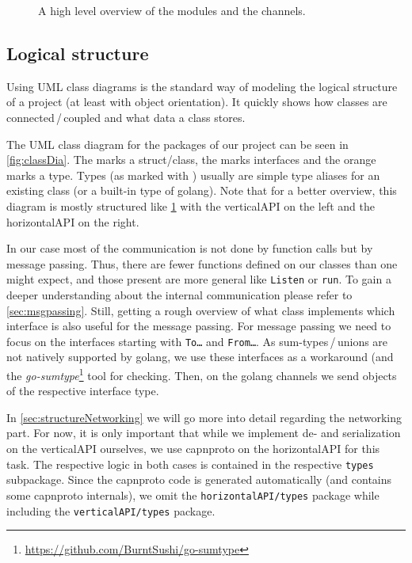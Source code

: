 \documentclass[a4paper,english,10pt,NET]{tumarticle}
\begin{document}
\begin{figure}
	\centering
	
	\caption{A high level overview of the modules and the channels.}
	\label{fig:overview}
\end{figure}

\subsection{Logical structure}
Using UML class diagrams is the standard way of modeling the logical structure of a project (at least with object orientation).
It quickly shows how classes are connected\,/\,coupled and what data a class stores.

The UML class diagram for the packages of our project can be seen in \cref{fig:classDia}.
The  marks a struct/class, the  marks interfaces and the orange  marks a type.
Types (as marked with ) usually are simple type aliases for an existing class (or a built-in type of golang).
Note that for a better overview, this diagram is mostly structured like \cref{fig:overview} with the verticalAPI on the left and the horizontalAPI on the right.

In our case most of the communication is not done by function calls but by message passing.
Thus, there are fewer functions defined on our classes than one might expect, and those present are more general like \texttt{Listen} or \texttt{run}.
To gain a deeper understanding about the internal communication please refer to \cref{sec:msgpassing}.
Still, getting a rough overview of what class implements which interface is also useful for the message passing.
For message passing we need to focus on the interfaces starting with \texttt{To\ldots} and \texttt{From\ldots}.
As sum-types\,/\,unions are not natively supported by golang, we use these interfaces as a workaround (and the \emph{go-sumtype}\footnote{\url{https://github.com/BurntSushi/go-sumtype}} tool for checking.
Then, on the golang channels we send objects of the respective interface type.

In \cref{sec:structureNetworking} we will go more into detail regarding the networking part.
For now, it is only important that while we implement de- and serialization on the verticalAPI ourselves, we use capnproto on the horizontalAPI for this task.
The respective logic in both cases is contained in the respective \texttt{types} subpackage.
Since the capnproto code is generated automatically (and contains some capnproto internals), we omit the \texttt{horizontalAPI/types} package while including the \texttt{verticalAPI/types} package.
\end{document}
